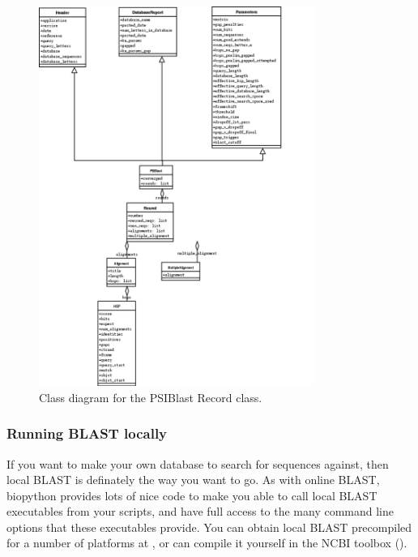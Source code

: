 \documentclass{article}
\begin{document}
\begin{latexonly}
\begin{figure}[htbp]
\centering
\includegraphics[width=0.8\textwidth]{images/PSIBlastRecord.png}
\caption{Class diagram for the PSIBlast Record class.}
\label{fig:psiblastrecord}
\end{figure}
\end{latexonly}

\subsubsection{Running BLAST locally}

If you want to make your own database to search for sequences against, then local BLAST is definately the way you want to go. As with online BLAST, biopython provides lots of nice code to make you able to call local BLAST executables from your scripts, and have full access to the many command line options that these executables provide. You can obtain local BLAST precompiled for a number of platforms at , or can compile it yourself in the NCBI toolbox ().
\end{document}
